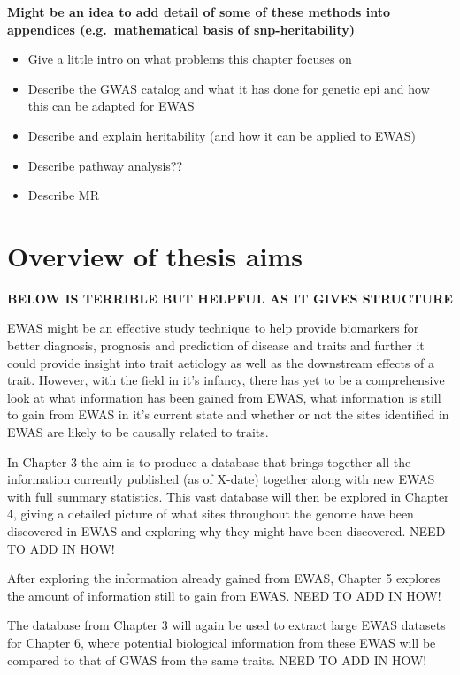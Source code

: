 \documentclass[11pt,twoside]{bristolthesis}
\providecommand{\tightlist}{%
  \setlength{\itemsep}{0pt}\setlength{\parskip}{0pt}}
\begin{document}
\textbf{Might be an idea to add detail of some of these methods into appendices (e.g.~mathematical basis of snp-heritability)}
\begin{itemize}
\tightlist
\item
  Give a little intro on what problems this chapter focuses on
\item
  Describe the GWAS catalog and what it has done for genetic epi and how this can be adapted for EWAS
\item
  Describe and explain heritability (and how it can be applied to EWAS)
\item
  Describe pathway analysis??
\item
  Describe MR
\end{itemize}
\hypertarget{overview-of-thesis-aims}{%
\section{Overview of thesis aims}\label{overview-of-thesis-aims}}

\textbf{BELOW IS TERRIBLE BUT HELPFUL AS IT GIVES STRUCTURE}

EWAS might be an effective study technique to help provide biomarkers for better diagnosis, prognosis and prediction of disease and traits and further it could provide insight into trait aetiology as well as the downstream effects of a trait. However, with the field in it's infancy, there has yet to be a comprehensive look at what information has been gained from EWAS, what information is still to gain from EWAS in it's current state and whether or not the sites identified in EWAS are likely to be causally related to traits.

In Chapter 3 the aim is to produce a database that brings together all the information currently published (as of X-date) together along with new EWAS with full summary statistics. This vast database will then be explored in Chapter 4, giving a detailed picture of what sites throughout the genome have been discovered in EWAS and exploring why they might have been discovered. NEED TO ADD IN HOW!

After exploring the information already gained from EWAS, Chapter 5 explores the amount of information still to gain from EWAS. NEED TO ADD IN HOW!

The database from Chapter 3 will again be used to extract large EWAS datasets for Chapter 6, where potential biological information from these EWAS will be compared to that of GWAS from the same traits. NEED TO ADD IN HOW!
\end{document}
